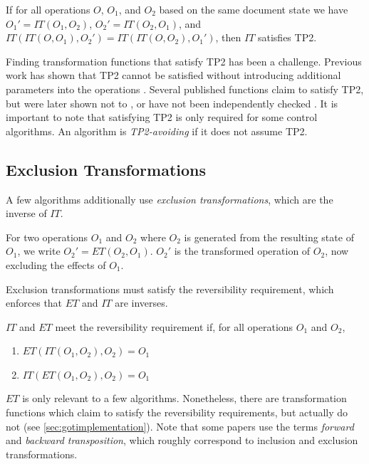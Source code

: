 \documentclass[sigplan,10pt,review,anonymous]{acmart}
\begin{document}
\begin{property}[TP2]
  If for all operations $O$, $O_1$, and $O_2$ based on the same document state we have $O_1' = IT(O_1, O_2)$, $O_2' = IT(O_2, O_1)$, and
  $IT(IT(O, O_1), O_2') = IT(IT(O, O_2), O_1')$, then $IT$ satisfies TP2.
\end{property}

Finding transformation functions that satisfy TP2 has been a challenge. Previous work has shown that TP2 cannot be satisfied without introducing additional parameters into the operations \cite{Randolph2015}. Several published functions claim to satisfy TP2, but were later shown not to \cite{Oster2005Proving}, or have not been independently checked
\cite{Randolph2015, Sun2017}. It is important to note that satisfying TP2 is only required for some control algorithms. An algorithm is \emph{TP2-avoiding}
if it does not assume TP2.

\subsection{Exclusion Transformations}


A few algorithms additionally use \emph{exclusion transformations}, which are the inverse of $IT$.

\begin{definition}
  For two operations $O_1$ and $O_2$ where $O_2$ is generated from the resulting state of $O_1$, we write $O_2' = ET(O_2, O_1)$. $O_2'$ is the transformed operation of $O_2$,
  now excluding the effects of $O_1$.
\end{definition}


Exclusion transformations must satisfy the reversibility requirement, which enforces that $ET$ and $IT$ are inverses.

\begin{property}
  $IT$ and $ET$ meet the reversibility requirement if, for all operations $O_1$ and $O_2$,
  \begin{enumerate}
    \item $ET(IT(O_1, O_2), O_2) = O_1$
    \item $IT(ET(O_1, O_2), O_2) = O_1$
  \end{enumerate}
\end{property}


$ET$ is only relevant to a few algorithms. Nonetheless, there are transformation functions which claim to satisfy the reversibility requirements, but actually do not (see \autoref{sec:gotimplementation}).
Note that some papers use the terms \emph{forward} and \emph{backward transposition}, which roughly correspond to inclusion and exclusion transformations.
\end{document}
